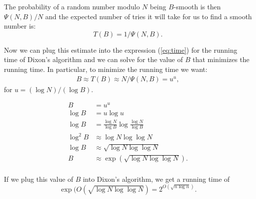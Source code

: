 The probability of a random number modulo $N$ being $B$-smooth is
then $\Psi(N,B)/N$ and the expected number of tries it will
take for us to find a smooth number is:
\[ T(B) = 1/\Psi(N,B).\]


Now we can plug this estimate into the expression (\ref{eq:time})
for the running time of Dixon's algorithm and we can solve
for the value of $B$ that minimizes the running time.
In particular, to minimize the running time we want:
\begin{align*}
  B \approx T(B) \approx N / \Psi(N,B) = u^u,
\end{align*}
for $u = (\log N)/(\log B)$.

\begin{align*}
  B &= u^u\\
  \log B &= u \log u\\
  \log B &= \frac{\log N}{\log B} \log \frac{\log N}{\log B}\\
  \log^2 B &\approx \log N \log \log N\\
\log B &\approx \sqrt{\log N \log \log N}\\
B &\approx \exp(\sqrt{\log N \log \log N}).\\
\end{align*}

If we plug this value of $B$ into Dixon's algorithm,
we get a running time of 
\[ \exp(O(\sqrt{ \log N \log \log N}) = 2^{O(\sqrt{ n \log n })}.\]



